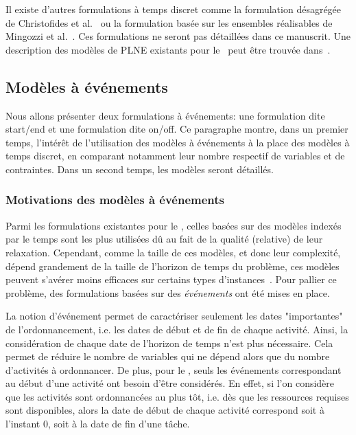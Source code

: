Il existe d'autres formulations à temps discret comme la formulation
désagrégée de Christofides et al.~\cite{CAVT} ou la formulation basée
sur les ensembles réalisables de Mingozzi et al.~\cite{MMRB}. Ces
formulations ne seront pas détaillées dans ce manuscrit. Une
description des modèles de PLNE existants pour le \RCPSP~peut être
trouvée dans~\cite{ADN}.

\subsection{Modèles à événements}
\label{sec:event_RCPSP}

Nous allons présenter deux formulations à événements: une formulation
dite start/end et une formulation dite on/off.  Ce paragraphe montre,
dans un premier temps, l'intérêt de l'utilisation des modèles à
événements à la place des modèles à temps discret, en comparant
notamment leur nombre respectif de variables et de contraintes.
Dans un second temps, les modèles seront détaillés.

\subsubsection{Motivations des modèles à événements}

Parmi les formulations existantes pour le \RCPSP, celles basées sur des
modèles indexés par le temps sont les plus utilisées dû au fait de la
qualité (relative) de leur relaxation.  Cependant, comme la taille de
ces modèles, et donc leur complexité, dépend grandement de la taille
de l'horizon de temps du problème, ces modèles peuvent s’avérer moins
efficaces sur certains types d'instances~\cite{modele_RCPSP}. Pour
pallier ce problème, des formulations basées sur des {\it événements}
ont été mises en place.

La notion d'événement permet de caractériser seulement les dates
"importantes" de l'ordonnancement, i.e. les dates de début et de
fin de chaque activité. Ainsi, la considération de chaque date de
l'horizon de temps n'est plus nécessaire. Cela permet de réduire
le nombre de variables qui ne dépend alors que du nombre
d'activités à ordonnancer. De plus, pour le \RCPSP, seuls les
événements correspondant au début d'une activité ont besoin d'être
considérés. En effet, si l'on considère que les activités sont
ordonnancées au plus tôt, i.e. dès que les ressources requises sont
disponibles, alors la date de début de chaque activité correspond soit
à l'instant $0$, soit à la date de fin d'une tâche.

